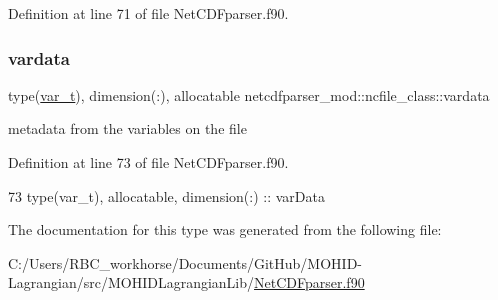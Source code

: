 Definition at line 71 of file Net\+C\+D\+Fparser.\+f90.

\mbox{\label{structnetcdfparser__mod_1_1ncfile__class_af4da1e5ae03037a7a8a8543713dcb8cd}} 
\subsubsection{\texorpdfstring{vardata}{vardata}}
{\footnotesize\ttfamily type(\mbox{\hyperlink{structnetcdfparser__mod_1_1var__t}{var\+\_\+t}}), dimension(\+:), allocatable netcdfparser\+\_\+mod\+::ncfile\+\_\+class\+::vardata\hspace{0.3cm}{\ttfamily [private]}}



metadata from the variables on the file 



Definition at line 73 of file Net\+C\+D\+Fparser.\+f90.


\begin{DoxyCode}
73         \textcolor{keywordtype}{type}(var\_t), \textcolor{keywordtype}{allocatable}, \textcolor{keywordtype}{dimension(:)} :: varData
\end{DoxyCode}


The documentation for this type was generated from the following file\+:\begin{DoxyCompactItemize}
\item 
C\+:/\+Users/\+R\+B\+C\+\_\+workhorse/\+Documents/\+Git\+Hub/\+M\+O\+H\+I\+D-\/\+Lagrangian/src/\+M\+O\+H\+I\+D\+Lagrangian\+Lib/\mbox{\hyperlink{_net_c_d_fparser_8f90}{Net\+C\+D\+Fparser.\+f90}}\end{DoxyCompactItemize}
